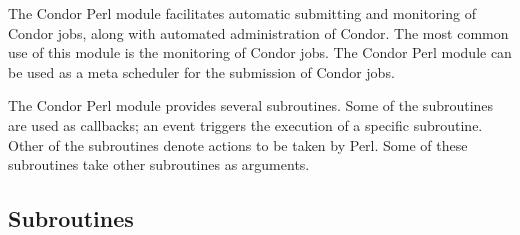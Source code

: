 
The Condor Perl module facilitates automatic submitting and monitoring of
Condor jobs, along with automated administration of Condor.
The most common
use of this module is the monitoring of Condor jobs.
The Condor Perl module can be used as a meta scheduler for the submission
of Condor jobs.

The Condor Perl module provides several subroutines.
Some of the subroutines are used as callbacks;
an event triggers the execution of a specific subroutine.
Other of the subroutines denote actions to be taken by Perl.
Some of these subroutines take other subroutines as arguments.

\subsection{Subroutines}
